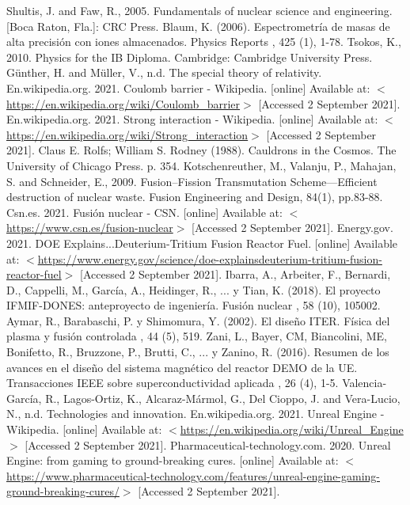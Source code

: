 \begin{thebibliography}{2}
	 Shultis, J. and Faw, R., 2005. Fundamentals of nuclear science and engineering. [Boca Raton, Fla.]: CRC Press.
	 Blaum, K. (2006). Espectrometría de masas de alta precisión con iones almacenados. Physics Reports , 425 (1), 1-78.
	 Tsokos, K., 2010. Physics for the IB Diploma. Cambridge: Cambridge University Press.
	 Günther, H. and Müller, V., n.d. The special theory of relativity.
	 En.wikipedia.org. 2021. Coulomb barrier - Wikipedia. [online] Available at: $<$\url{https://en.wikipedia.org/wiki/Coulomb\_barrier}$>$ [Accessed 2 September 2021].
	 En.wikipedia.org. 2021. Strong interaction - Wikipedia. [online] Available at: $<$\url{https://en.wikipedia.org/wiki/Strong\_interaction}$>$ [Accessed 2 September 2021].
	 Claus E. Rolfs; William S. Rodney (1988). Cauldrons in the Cosmos. The University of Chicago Press. p. 354.
	 Kotschenreuther, M., Valanju, P., Mahajan, S. and Schneider, E., 2009. Fusion–Fission Transmutation Scheme—Efficient destruction of nuclear waste. Fusion Engineering and Design, 84(1), pp.83-88.
	 Csn.es. 2021. Fusión nuclear - CSN. [online] Available at: $<$\url{https://www.csn.es/fusion-nuclear}$>$ [Accessed 2 September 2021].
	 Energy.gov. 2021. DOE Explains...Deuterium-Tritium Fusion Reactor Fuel. [online] Available at: $<$\url{https://www.energy.gov/science/doe-explainsdeuterium-tritium-fusion-reactor-fuel}$>$ [Accessed 2 September 2021].
	 Ibarra, A., Arbeiter, F., Bernardi, D., Cappelli, M., García, A., Heidinger, R., ... y Tian, K. (2018). El proyecto IFMIF-DONES: anteproyecto de ingeniería. Fusión nuclear , 58 (10), 105002.
	 Aymar, R., Barabaschi, P. y Shimomura, Y. (2002). El diseño ITER. Física del plasma y fusión controlada , 44 (5), 519.
	 Zani, L., Bayer, CM, Biancolini, ME, Bonifetto, R., Bruzzone, P., Brutti, C., ... y Zanino, R. (2016). Resumen de los avances en el diseño del sistema magnético del reactor DEMO de la UE. Transacciones IEEE sobre superconductividad aplicada , 26 (4), 1-5.
	 Valencia-García, R., Lagos-Ortiz, K., Alcaraz-Mármol, G., Del Cioppo, J. and Vera-Lucio, N., n.d. Technologies and innovation.
	 En.wikipedia.org. 2021. Unreal Engine - Wikipedia. [online] Available at: $<$\url{https://en.wikipedia.org/wiki/Unreal\_Engine}$>$ [Accessed 2 September 2021].
	 Pharmaceutical-technology.com. 2020. Unreal Engine: from gaming to ground-breaking cures. [online] Available at: $<$\url{https://www.pharmaceutical-technology.com/features/unreal-engine-gaming-ground-breaking-cures/}$>$ [Accessed 2 September 2021].

\end{thebibliography}
